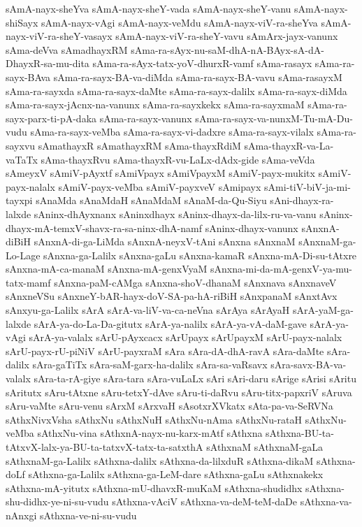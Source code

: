 {sAmA-nayx-sheYva
sAmA-nayx-sheY-vada
sAmA-nayx-sheY-vanu
sAmA-nayx-shiSayx
sAmA-nayx-vAgi
sAmA-nayx-veMdu
sAmA-nayx-viV-ra-sheYva
sAmA-nayx-viV-ra-sheY-vasayx
sAmA-nayx-viV-ra-sheY-vavu
sAmArx-jayx-vanunx
sAma-deVva
sAmadhayxRM
sAma-ra-sAyx-nu-saM-dhA-nA-BAyx-sA-dA-DhayxR-sa-mu-dita
sAma-ra-sAyx-tatx-yoV-dhurxR-vamf
sAma-rasayx
sAma-ra-sayx-BAva
sAma-ra-sayx-BA-va-diMda
sAma-ra-sayx-BA-vavu
sAma-rasayxM
sAma-ra-sayxda
sAma-ra-sayx-daMte
sAma-ra-sayx-dalilx
sAma-ra-sayx-diMda
sAma-ra-sayx-jAcnx-na-vanunx
sAma-ra-sayxkekx
sAma-ra-sayxmaM
sAma-ra-sayx-parx-ti-pA-daka
sAma-ra-sayx-vanunx
sAma-ra-sayx-va-nunxM-Tu-mA-Du-vudu
sAma-ra-sayx-veMba
sAma-ra-sayx-vi-dadxre
sAma-ra-sayx-vilalx
sAma-ra-sayxvu
sAmathayxR
sAmathayxRM
sAma-thayxRdiM
sAma-thayxR-va-La-vaTaTx
sAma-thayxRvu
sAma-thayxR-vu-LaLx-dAdx-gide
sAma-veVda
sAmeyxV
sAmiV-pAyxtf
sAmiVpayx
sAmiVpayxM
sAmiV-payx-mukitx
sAmiV-payx-nalalx
sAmiV-payx-veMba
sAmiV-payxveV
sAmipayx
sAmi-tiV-biV-ja-mi-tayxpi
sAnaMda
sAnaMdaH
sAnaMdaM
sAnaM-da-Qu-Siyu
sAni-dhayx-ra-lalxde
sAninx-dhAyxnanx
sAninxdhayx
sAninx-dhayx-da-lilx-ru-va-vanu
sAninx-dhayx-mA-temxV-shavx-ra-sa-ninx-dhA-namf
sAninx-dhayx-vanunx
sAnxnA-diBiH
sAnxnA-di-ga-LiMda
sAnxnA-neyxV-tAni
sAnxna
sAnxnaM
sAnxnaM-ga-Lo-Lage
sAnxna-ga-Lalilx
sAnxna-gaLu
sAnxna-kamaR
sAnxna-mA-Di-su-tAtxre
sAnxna-mA-ca-manaM
sAnxna-mA-genxVyaM
sAnxna-mi-da-mA-genxV-ya-mu-tatx-mamf
sAnxna-paM-cAMga
sAnxna-shoV-dhanaM
sAnxnava
sAnxnaveV
sAnxneVSu
sAnxneY-bAR-hayx-doV-SA-pa-hA-riBiH
sAnxpanaM
sAnxtAvx
sAnxyu-ga-Lalilx
sArA
sArA-va-liV-va-ca-neVna
sArAya
sArAyaH
sArA-yaM-ga-lalxde
sArA-ya-do-La-Da-gitutx
sArA-ya-nalilx
sArA-ya-vA-daM-gave
sArA-ya-vAgi
sArA-ya-valalx
sArU-pAyxcacx
sArUpayx
sArUpayxM
sArU-payx-nalalx
sArU-payx-rU-piNiV
sArU-payxraM
sAra
sAra-dA-dhA-ravA
sAra-daMte
sAra-dalilx
sAra-gaTiTx
sAra-saM-garx-ha-dalilx
sAra-sa-vaRsavx
sAra-savx-BA-va-valalx
sAra-ta-rA-giye
sAra-tara
sAra-vuLaLx
sAri
sAri-daru
sArige
sArisi
sAritu
sAritutx
sAru-tAtxne
sAru-tetxY-dAve
sAru-ti-daRvu
sAru-titx-papxriV
sAruva
sAru-vaMte
sAru-venu
sArxM
sArxvaH
sAsotxrXVkatx
sAta-pa-va-SeRVNa
sAthxNivxVsha
sAthxNu
sAthxNuH
sAthxNu-nAma
sAthxNu-rataH
sAthxNu-veMba
sAthxNu-vina
sAthxnA-nayx-nu-karx-mAtf
sAthxna
sAthxna-BU-ta-tAtxvX-lalx-ya-BU-ta-tatxvX-tatx-ta-satxthA
sAthxnaM
sAthxnaM-gaLa
sAthxnaM-ga-Lalilx
sAthxna-dalilx
sAthxna-da-lilxduR
sAthxna-dikaM
sAthxna-doLf
sAthxna-ga-Lalilx
sAthxna-ga-LeM-dare
sAthxna-gaLu
sAthxnakekx
sAthxna-mA-yitutx
sAthxna-mU-dhavxR-muKaM
sAthxna-shudidhx
sAthxna-shu-didhx-ye-ni-su-vudu
sAthxna-vAciV
sAthxna-va-deM-teM-daDe
sAthxna-va-nAnxgi
sAthxna-ve-ni-su-vudu
}
